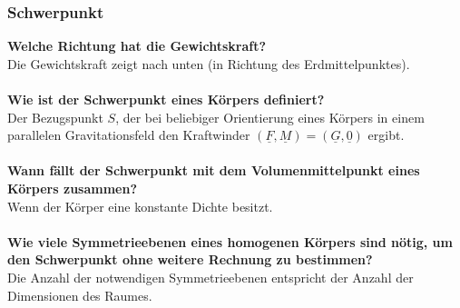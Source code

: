 \documentclass[a4paper,twocolumn,10pt]{article}
\begin{document}
\subsubsection{Schwerpunkt}
\textbf{Welche Richtung hat die Gewichtskraft?}\\
Die Gewichtskraft zeigt nach unten (in Richtung des Erdmittelpunktes).\\\\
\textbf{Wie ist der Schwerpunkt eines Körpers definiert?}\\
Der Bezugspunkt $S$, der bei beliebiger Orientierung eines Körpers in einem parallelen Gravitationsfeld den Kraftwinder $(\underline{F},\underline{M})=(\underline{G},\underline{0})$ ergibt.\\\\
\textbf{Wann fällt der Schwerpunkt mit dem Volumenmittelpunkt eines Körpers zusammen?}\\
Wenn der Körper eine konstante Dichte besitzt.\\\\
\textbf{Wie viele Symmetrieebenen eines homogenen Körpers sind nötig, um den Schwerpunkt ohne weitere Rechnung zu bestimmen?}\\
Die Anzahl der notwendigen Symmetrieebenen entspricht der Anzahl der Dimensionen des Raumes.
\end{document}
